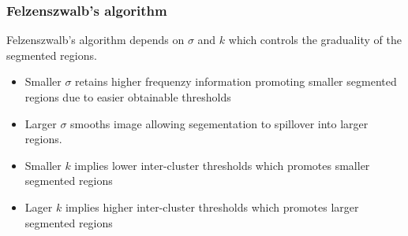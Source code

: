\subsubsection{Felzenszwalb's algorithm}
Felzenszwalb's algorithm depends on \(\sigma\) and \(k\) which controls the graduality of the segmented regions.
\begin{itemize}
    \item Smaller \(\sigma\) retains higher frequenzy information promoting smaller segmented regions due to easier obtainable thresholds
    \item Larger \(\sigma\) smooths image allowing segementation to spillover into larger regions.
    \item Smaller \(k \) implies lower inter-cluster thresholds which promotes smaller segmented regions
    \item Lager \(k \) implies higher inter-cluster thresholds which promotes larger segmented regions
\end{itemize}
